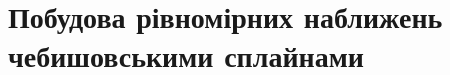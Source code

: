 \documentclass[ukrainian,14pt]{extarticle}
\begin{document}


\newpage

\section{Побудова рівномірних наближень чебишовськими сплайнами}
\end{document}
